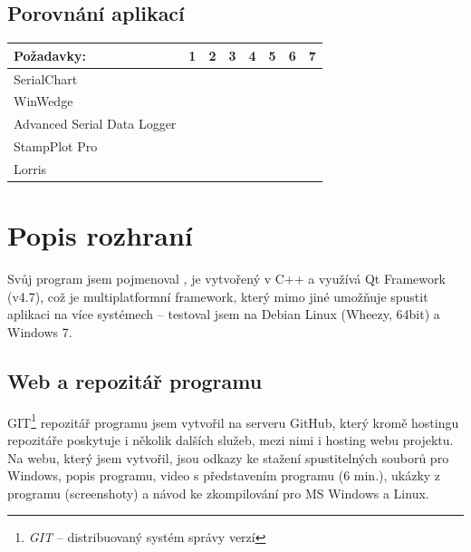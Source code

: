 \documentclass[12pt, a4paper, oneside]{article}
\newcommand{\It}{\textit}  %
\newcommand{\Has}{\textcolor{green}{\CheckmarkBold}}
\newcommand{\NoHas}{\textcolor{red}{\XSolidBrush}}
\begin{document}
\subsection*{Porovnání aplikací}

\begin{tabular}{ | l | l | l | l | l | l | l | l |}
    \hline
    Požadavky:                  & 1      & 2      & 3      & 4      & 5      & 6      & 7      \\ \hline
    SerialChart                 & \Has   & \NoHas & \Has   & \NoHas & \Has   & \Has   & \Has   \\ \hline 
    WinWedge                    & \NoHas & \Has   & \Has   & \NoHas & \NoHas & \NoHas & \NoHas \\ \hline 
    Advanced Serial Data Logger & \NoHas & \Has   & \Has   & \NoHas & \NoHas & \NoHas & \NoHas \\ \hline 
    StampPlot Pro               & \Has   & \Has   & \NoHas & \NoHas & \Has   & \NoHas & \Has   \\ \hline 
    Lorris                      & \Has   & \Has   & \Has   & \Has   & \Has   & \Has   & \Has   \\ \hline 
\end{tabular}

\section{Popis rozhraní}
Svůj program jsem pojmenoval , je vytvořený v C++ a využívá Qt Framework\cite{qtfrm} (v4.7), což je multiplatformní framework, který mimo jiné umožňuje spustit aplikaci na více systémech -- testoval jsem na Debian Linux\cite{debian} (Wheezy, 64bit) a Windows 7.

\subsection{Web a repozitář programu}
GIT\footnote{\It{GIT} -- distribuovaný systém správy verzí} repozitář programu jsem vytvořil na serveru GitHub\cite{github}, který kromě hostingu repozitáře poskytuje i několik dalších služeb, mezi nimi i hosting webu projektu. Na webu, který jsem vytvořil, jsou odkazy ke stažení spustitelných souborů pro Windows, popis programu, video s představením programu (6 min.), ukázky z programu (screenshoty) a návod ke zkompilování pro MS Windows a Linux.
\end{document}
